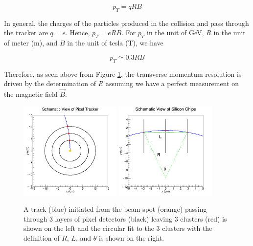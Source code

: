 \begin{equation}
p_T  = qRB
\end{equation}

In general, the charges of the particles produced in the collision and pass through the tracker are $q = e$. Hence, $p_T = eRB$. For $p_T$ in the unit of GeV, $R$ in the unit of meter (m), and $B$ in the unit of tesla (T), we have 

\begin{equation}
p_T  \simeq 0.3 RB
\end{equation}

Therefore, as seen above from Figure \ref{HelixAndFit}, the transverse momentum resolution is driven by the determination of $R$ assuming we have a perfect measurement on the magnetic field $\vec{B}$.

\begin{figure}[hbtp]
\begin{center}
\includegraphics[width=0.45\textwidth]{Figures/Chapter4/PixLayTrk.png}
\includegraphics[width=0.45\textwidth]{Figures/Chapter4/FitOnHits.png}
\caption{A track (blue) initiated from the beam spot (orange) passing through 3 layers of pixel detectors (black) leaving 3 clusters (red) is shown on the left and the circular fit to the 3 clusters with the definition of $R$, $L$, and $\theta$ is shown on the right.}
\label{HelixAndFit}
\end{center}
\end{figure} 



